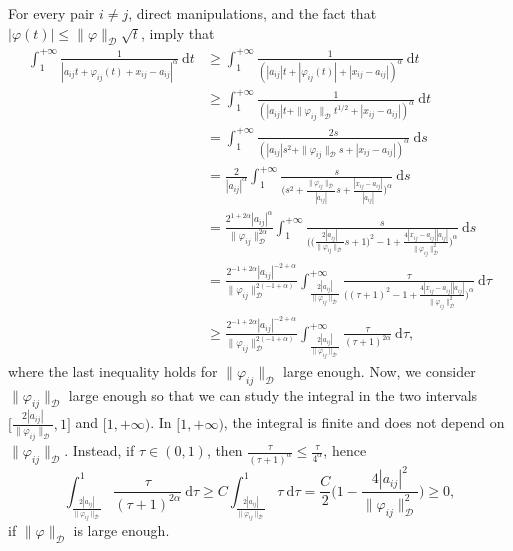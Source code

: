 \documentclass[a4paper,10pt]{amsart}
\newcommand{\ud}{\mathrm{d}}
\theoremstyle{plain}
\theoremstyle{definition}
\numberwithin{equation}{section}
\numberwithin{thm}{section}
\begin{document}
For every pair $i\neq j$, direct manipulations, and the fact that $|\varphi(t)|\le \|\varphi\|_{\mathcal D} \sqrt{t}$, imply that 
\[
\begin{split}
    \int_{1}^{+\infty} \frac{1}{|a_{ij}t + \varphi_{ij}(t) + x_{ij} - a_{ij}|^\alpha}\ \ud t & \ge \int_{1}^{+\infty} \frac{1}{(|a_{ij}|t + |\varphi_{ij}(t)| + |x_{ij} - a_{ij}|)^\alpha}\ \ud t\\
    & \ge \int_{1}^{+\infty} \frac{1}{(|a_{ij}|t + \|\varphi_{ij}\|_\mathcal{D}t^{1/2} + |x_{ij} - a_{ij}|)^\alpha}\ \ud t\\
    & = \int_{1}^{+\infty} \frac{2s}{(|a_{ij}|s^2 + \|\varphi_{ij}\|_\mathcal{D}s + |x_{ij} - a_{ij}|)^\alpha}\ \ud s\\
    & =\frac{2}{|a_{ij}|^\alpha} \int_{1}^{+\infty} \frac{s}{\big(s^2 + \frac{\|\varphi_{ij}\|_\mathcal{D}}{|a_{ij}|}s + \frac{|x_{ij} - a_{ij}|}{|a_{ij}|}\big)^\alpha}\ \ud s\\
    & = \frac{2^{1+2\alpha}|a_{ij}|^\alpha}{\|\varphi_{ij}\|_{\mathcal{D}}^{2\alpha}} \int_{1}^{+\infty} \frac{s}{\bigg(\big( \frac{2|a_{ij}|}{\|\varphi_{ij}\|_{\mathcal{D}}}s +1 \big)^2 - 1 + \frac{4|x_{ij}-a_{ij}| |a_{ij}|}{\|\varphi_{ij}\|^2_{\mathcal{D}}}\bigg)^\alpha}\ \ud s\\
    & = \frac{2^{-1+2\alpha}|a_{ij}|^{-2+\alpha}}{\|\varphi_{ij}\|_{\mathcal{D}}^{2(-1+\alpha)}} \int_{\frac{2|a_{ij}|}{\|\varphi_{ij}\|_\mathcal{D}}}^{+\infty} \frac{\tau}{\bigg((\tau+1)^2-1+\frac{4|x_{ij}-a_{ij}| |a_{ij}|}{\|\varphi_{ij}\|^2_{\mathcal{D}}}\bigg)^\alpha}\ \ud \tau\\
    & \ge \frac{2^{-1+2\alpha}|a_{ij}|^{-2+\alpha}}{\|\varphi_{ij}\|_{\mathcal{D}}^{2(-1+\alpha)}} \int_{\frac{2|a_{ij}|}{\|\varphi_{ij}\|_\mathcal{D}}}^{+\infty} \frac{\tau}{(\tau+1)^{2\alpha}}\ \ud \tau,
\end{split}
\]
where the last inequality holds for $\|\varphi_{ij}\|_\mathcal{D}$ large enough. Now, we consider $\|\varphi_{ij}\|_\mathcal{D}$ large enough so that we can study the integral in the two intervals $\big[\frac{2|a_{ij}|}{\|\varphi_{ij}\|_\mathcal{D}},1\big]$ and $[1,+\infty)$. In $[1,+\infty)$, the integral is finite and does not depend on $\|\varphi_{ij}\|_\mathcal{D}$. Instead, if $\tau \in (0,1)$, then $\frac{\tau}{(\tau+1)^\alpha}\le \frac{\tau}{4^\alpha}$, hence
\[
\int_{\frac{2|a_{ij}|}{\|\varphi_{ij}\|_\mathcal{D}}}^{1} \frac{\tau}{(\tau+1)^{2\alpha}}\ \ud \tau \ge C\int_{\frac{2|a_{ij}|}{\|\varphi_{ij}\|_\mathcal{D}}}^{1} \tau\ \ud \tau = \frac{C}{2}\bigg(1-\frac{4|a_{ij}|^2}{\|\varphi_{ij}\|_\mathcal{D}^2}\bigg)\ge 0,
\]
if $\|\varphi\|_{\mathcal D}$ is large enough.
\end{document}
